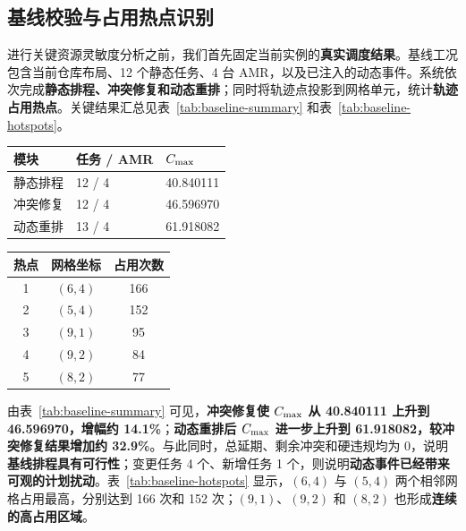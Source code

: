 \subsection{基线校验与占用热点识别}

进行关键资源灵敏度分析之前，我们首先固定当前实例的\textbf{真实调度结果}。基线工况包含当前仓库布局、12 个静态任务、4 台 AMR，以及已注入的动态事件。系统依次完成\textbf{静态排程、冲突修复和动态重排}；同时将轨迹点投影到网格单元，统计\textbf{轨迹占用热点}。关键结果汇总见表~\ref{tab:baseline-summary} 和表~\ref{tab:baseline-hotspots}。

\begin{center}
\begin{minipage}[t]{0.53\linewidth}
\centering
\small
{}
\label{tab:baseline-summary}
\renewcommand{\arraystretch}{1.76}
\begin{tabular}{@{}lll@{}}
\toprule
模块 & 任务 / AMR & $C_{\max}$ \\
\midrule
静态排程 & 12 / 4 & 40.840111 \\
冲突修复 & 12 / 4 & 46.596970 \\
动态重排 & 13 / 4 & 61.918082 \\
\bottomrule
\end{tabular}
\renewcommand{\arraystretch}{1}
\end{minipage}
\hfill
\begin{minipage}[t]{0.39\linewidth}
\centering
\small
{}
\label{tab:baseline-hotspots}
\begin{tabular}{@{}ccc@{}}
\toprule
热点 & 网格坐标 & 占用次数 \\
\midrule
1 & $(6,4)$ & 166 \\
2 & $(5,4)$ & 152 \\
3 & $(9,1)$ & 95 \\
4 & $(9,2)$ & 84 \\
5 & $(8,2)$ & 77 \\
\bottomrule
\end{tabular}
\end{minipage}
\end{center}

由表~\ref{tab:baseline-summary} 可见，\textbf{冲突修复使 $C_{\max}$ 从 40.840111 上升到 46.596970，增幅约 14.1\%}；\textbf{动态重排后 $C_{\max}$ 进一步上升到 61.918082，较冲突修复结果增加约 32.9\%}。与此同时，总延期、剩余冲突和硬违规均为 0，说明\textbf{基线排程具有可行性}；变更任务 4 个、新增任务 1 个，则说明\textbf{动态事件已经带来可观的计划扰动}。表~\ref{tab:baseline-hotspots} 显示，$(6,4)$ 与 $(5,4)$ 两个相邻网格占用最高，分别达到 166 次和 152 次；$(9,1)$、$(9,2)$ 和 $(8,2)$ 也形成\textbf{连续的高占用区域}。

